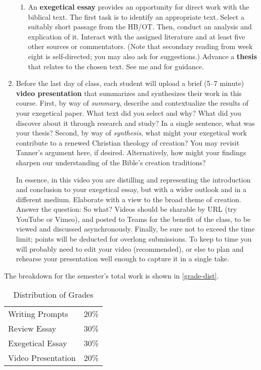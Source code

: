 \documentclass[titlepage]{article}
\begin{document}
\begin{enumerate}
\begin{enumerate}
		\item An \textbf{exegetical essay} provides an opportunity for
		direct work with the biblical text. The first task is to
		identify an appropriate text. Select a suitably short passage
		from the HB/OT. Then, conduct an analysis and explication of it.
		Interact with the assigned literature and at least five other
		sources or commentators. (Note that secondary reading from week
		eight is self-directed; you may also ask for suggestions.)
		Advance a \textbf{thesis} that relates to the chosen text. See
		me and \cite[chs 3, 5, 8, 11]{rlgs} for guidance.

	\end{enumerate}

	\item Before the last day of class, each student will upload a brief
	(5--7 minute) \textbf{video presentation} that summarizes and
	synthesizes their work in this course. First, by way of
	\emph{summary}, describe and contextualize the results of your
	exegetical paper. What text did you select and why? What did you
	discover about it through research and study? In a single sentence,
	what was your thesis? Second, by way of \emph{synthesis}, what might
	your exegetical work contribute to a renewed Christian theology of
	creation? You may revisit Tanner's argument here, if desired.
	Alternatively, how might your findings sharpen our understanding of
	the Bible's creation traditions?

	In essence, in this video you are distilling and representing the
	introduction and conclusion to your exegetical essay, but with a
	wider outlook and in a different medium. Elaborate with a view to
	the broad theme of creation. Answer the question: So what? Videos
	should be sharable by URL (try YouTube or Vimeo), and posted to
	Teams for the benefit of the class, to be viewed and discussed
	asynchronously. Finally, be sure not to exceed the time limit;
	points will be deducted for overlong submissions. To keep to time
	you will probably need to edit your video (recommended), or else to
	plan and rehearse your presentation well enough to capture it in a
	single take.

\end{enumerate}

The breakdown for the semester's total work is shown in
\autoref{grade-dist}.

\begin{table}[htbp]
  \centering
  {\lining
  \begin{tabular}{lr}
    \toprule
    Writing Prompts    & 20\% \\
    Review Essay       & 30\% \\
    Exegetical Essay   & 30\% \\
    Video Presentation & 20\% \\
    \bottomrule
  \end{tabular}}
  \caption{Distribution of Grades}
  \label{grade-dist}
\end{table}
\end{document}
